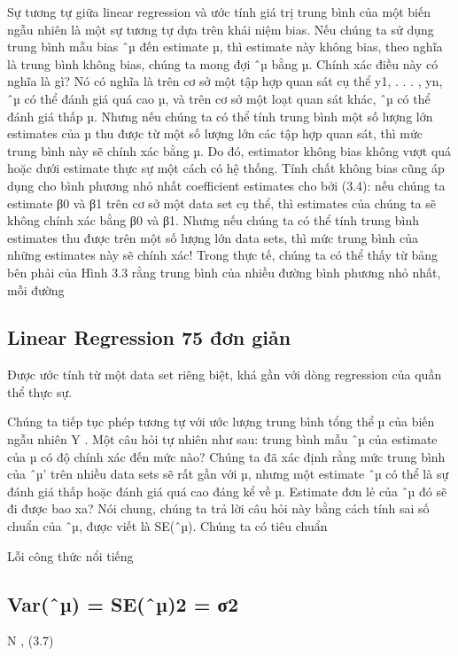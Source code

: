 Sự tương tự giữa linear regression và ước tính giá trị trung bình của một biến ngẫu nhiên là một sự tương tự dựa trên khái niệm bias. Nếu chúng ta sử dụng trung bình mẫu bias ˆµ đến estimate µ, thì estimate này không bias, theo nghĩa là trung bình không bias, chúng ta mong đợi ˆµ bằng µ. Chính xác điều này có nghĩa là gì? Nó có nghĩa là trên cơ sở một tập hợp quan sát cụ thể y1, . . . , yn, ˆµ có thể đánh giá quá cao µ, và trên cơ sở một loạt quan sát khác, ˆµ có thể đánh giá thấp µ. Nhưng nếu chúng ta có thể tính trung bình một số lượng lớn estimates của µ thu được từ một số lượng lớn các tập hợp quan sát, thì mức trung bình này sẽ chính xác bằng µ. Do đó, estimator không bias không vượt quá hoặc dưới estimate thực sự một cách có hệ thống. Tính chất không bias cũng áp dụng cho bình phương nhỏ nhất coefficient estimates cho bởi (3.4): nếu chúng ta estimate β0 và β1 trên cơ sở một data set cụ thể, thì estimates của chúng ta sẽ không chính xác bằng β0 và β1. Nhưng nếu chúng ta có thể tính trung bình estimates thu được trên một số lượng lớn data sets, thì mức trung bình của những estimates này sẽ chính xác! Trong thực tế, chúng ta có thể thấy từ bảng bên phải của Hình 3.3 rằng trung bình của nhiều đường bình phương nhỏ nhất, mỗi đường

\subsection{Linear Regression 75 đơn giản}

Được ước tính từ một data set riêng biệt, khá gần với dòng regression của quần thể thực sự.

Chúng ta tiếp tục phép tương tự với ước lượng trung bình tổng thể µ của biến ngẫu nhiên Y . Một câu hỏi tự nhiên như sau: trung bình mẫu ˆµ của estimate của µ có độ chính xác đến mức nào? Chúng ta đã xác định rằng mức trung bình của ˆµ’ trên nhiều data sets sẽ rất gần với µ, nhưng một estimate ˆµ có thể là sự đánh giá thấp hoặc đánh giá quá cao đáng kể về µ. Estimate đơn lẻ của ˆµ đó sẽ đi được bao xa? Nói chung, chúng ta trả lời câu hỏi này bằng cách tính sai số chuẩn của ˆµ, được viết là SE(ˆµ). Chúng ta có tiêu chuẩn

Lỗi công thức nổi tiếng

\subsection{Var(ˆµ) = SE(ˆµ)2 = σ2}

N , (3.7)

